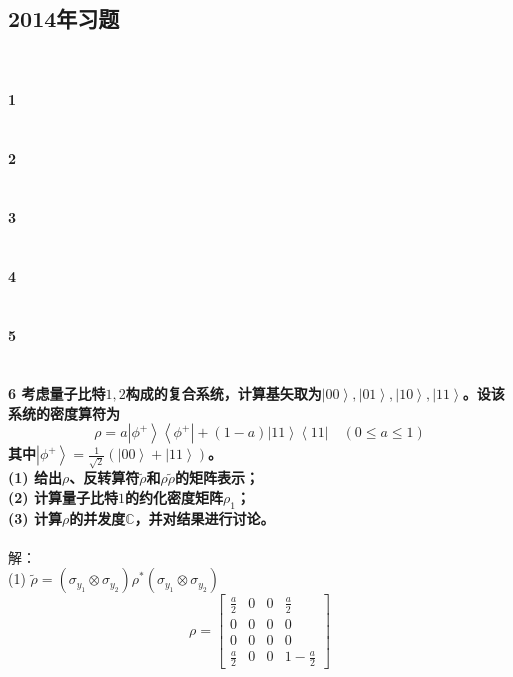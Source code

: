 \documentclass[12pt]{article}
\numberwithin{equation}{section}	 %
\begin{document}
\begin{spacing}{1.5}
\newpage
\subsection{2014年习题}
~\\
~\\
\textbf{1 \quad }\\
~\\
~\\
\textbf{2 \quad }\\
~\\
~\\
\textbf{3 \quad }\\
~\\
~\\
\textbf{4 \quad }\\
~\\
~\\
\textbf{5 \quad }\\
~\\
~\\
\textbf{6 \quad 考虑量子比特$1, 2$构成的复合系统，计算基矢取为$\left|00\right>,\left|01\right>,\left|10\right>,\left|11\right>$。设该系统的密度算符为
\begin{equation}\nonumber 		%
\rho = a\left|\phi^{+}\right>\left<\phi^{+}\right| + (1-a)\left|11\right>\left<11\right| \quad (0 \le a \le 1)
\end{equation}
其中$\displaystyle \left|\phi^{+}\right>=\frac{1}{\sqrt{2}}\left(\left|00\right>+\left|11\right>\right)$。\\
(1) 给出$\rho$、反转算符$\tilde\rho$和$\rho\tilde\rho$的矩阵表示；\\
(2) 计算量子比特$1$的约化密度矩阵$\rho_{1}$；\\
(3) 计算$\rho$的并发度$\mathbb{C}$，并对结果进行讨论。		%
}\\
~\\
解：\\
(1) $\tilde{\rho} = (\sigma_{y_{1}}\otimes\sigma_{y_{2}})\rho^{*}(\sigma_{y_{1}}\otimes\sigma_{y_{2}})$
\begin{equation}\nonumber 		%
\rho = \begin{bmatrix} \displaystyle \frac{a}{2} & 0 & 0 & \displaystyle \frac{a}{2} \\ 0 & 0 & 0 & 0 \\ 0 & 0 & 0 & 0 \\ \displaystyle \frac{a}{2} & 0 & 0 & \displaystyle 1-\frac{a}{2} \end{bmatrix}

\end{equation}
\end{spacing}
\end{document}
